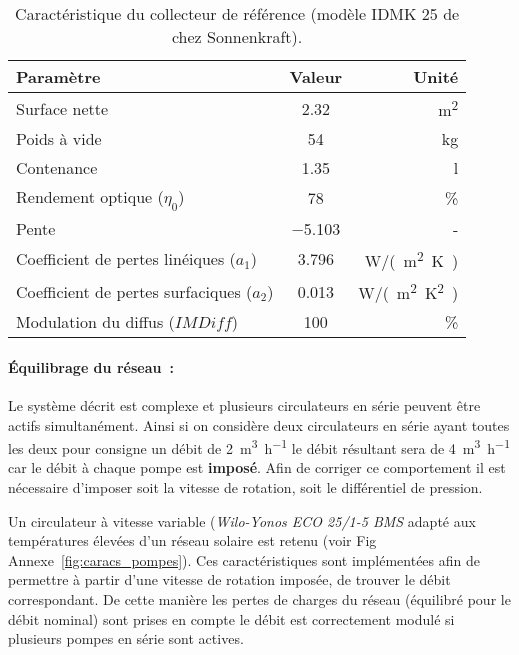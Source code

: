 \begin{table}
\centering
\caption{Caractéristique du collecteur de référence (modèle IDMK 25 de chez Sonnenkraft).}
\label{tab:idmk_specs}
\begin{tabular}{lcr}
    \toprule
    Paramètre                                   & Valeur         & Unité                 \\
    \midrule
    Surface nette                               & \num{2.32}           & \si{m^{2}}            \\
    Poids à vide                                & \num{54}             & \si{kg}               \\
    Contenance                                  & \num{1.35}           & \si{l}                \\
    Rendement optique ($\eta_{0}$)              & \num{78}             & \si{\%}               \\
    Pente                                       & \num{-5.103}         & -                     \\
    Coefficient de pertes linéiques ($a_{1}$)   & \num{3.796}          & \si{W/(m^{2}.K)}      \\
    Coefficient de pertes surfaciques ($a_{2}$) & \num{0.013}          & \si{W/(m^{2}.K^{2})}  \\
    Modulation du diffus ($IMDiff$)             & \num{100}            & \si{\%}               \\
    \bottomrule
\end{tabular}
\end{table}

\paragraph{Équilibrage du réseau~:} %
\label{par:equilibrage_du_reseau}
Le système décrit est complexe et plusieurs circulateurs en série peuvent être actifs
simultanément. Ainsi si on considère deux circulateurs en série ayant toutes les deux pour
consigne un débit de \SI[per- mode=symbol]{2}{\meter\cubed\per\hour} le débit résultant
sera de \SI[per-mode=symbol]{4}{\meter\cubed\per\hour} car le débit à chaque pompe est
\textbf{imposé}. Afin de corriger ce comportement il est nécessaire d’imposer soit la
vitesse de rotation, soit le différentiel de pression.

Un circulateur à vitesse variable (\emph
{Wilo-Yonos ECO 25/1-5 BMS} adapté aux températures élevées d’un réseau solaire est
retenu (voir Fig Annexe~\ref{fig:caracs_pompes}). Ces caractéristiques sont implémentées afin de permettre à partir d’une vitesse de
rotation imposée, de trouver le débit correspondant. De cette manière les pertes de charges
du réseau (équilibré pour le débit nominal) sont prises en compte le débit est
correctement modulé si plusieurs pompes en série sont actives.


